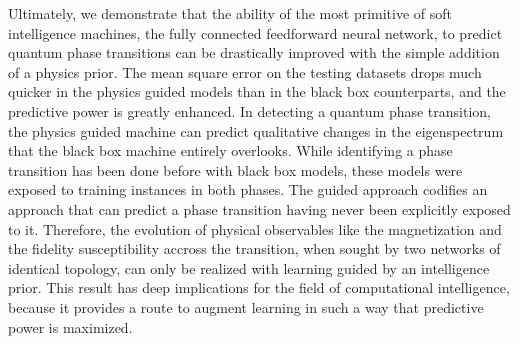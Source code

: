 Ultimately, we demonstrate that the ability of the most primitive of soft
intelligence machines, the fully connected feedforward neural network, to
predict quantum phase transitions can be drastically improved with the simple
addition of a physics prior. The mean square error on the testing datasets
drops much quicker in the physics guided models than in the black box
counterparts, and the predictive power is greatly enhanced. In detecting a
quantum phase transition, the physics guided machine can predict qualitative
changes in the eigenspectrum that the black box machine entirely overlooks.
While identifying a phase transition has been done before with black box
models, these models were exposed to training instances in both phases. The
guided approach codifies an approach that can predict a phase transition having
never been explicitly exposed to it. Therefore, the evolution of physical
observables like the magnetization and the fidelity susceptibility accross the
transition, when sought by two networks of identical topology, can only be
realized with learning guided by an intelligence prior.  This result has deep
implications for the field of computational intelligence, because it provides a
route to augment learning in such a way that predictive power is maximized. 

